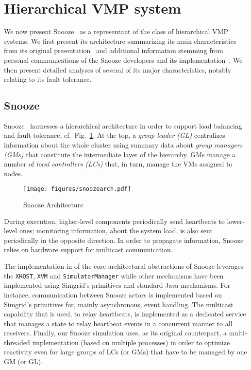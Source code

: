 \section{Hierarchical VMP system}

We now present Snooze~\cite{feller:ccgrid12} as a representant of the
class of hierarchical VMP systems.  We first present its architecture
summarizing its main characteristics from its original
presentation~\cite{feller:ccgrid12} and additional information
stemming from personal communications of the Snooze developers and its
implementation~\cite{snoozeweb,snoozedev14}. We then present detailed
analyses of several of its major characteristics, notably relating to its
fault tolerance.

\subsection{Snooze}
\label{sec:snoozeArchi}

Snooze~\cite{snoozeweb,feller:ccgrid12} harnesses a hierarchical
architecture in order to support load balancing and fault tolerance,
cf.\ Fig.~\ref{fig:snoozearch}.
At the top, %
 a \emph{group leader (GL)} centralizes information about the whole
cluster using summary data about \emph{group managers (GMs)} that
constitute the intermediate layer of the hierarchy. GMs manage a
number of \emph{local controllers (LCs)} that, in turn, manage the VMs
assigned to nodes.

\begin{figure}
  {\centering
\texttt{[image: figures/snoozearch.pdf]}}
  \caption{Snooze Architecture}
  \label{fig:snoozearch}
\end{figure}
During execution, higher-level components periodically send heartbeats
to lower-level ones; monitoring information, \eg about the system
load, is also sent periodically in the opposite direction. In order to
propagate information, Snooze relies on hardware support for multicast
communication.

The implementation in \vmps of the core architectural abstractions of
Snooze %
leverages the \texttt{XHOST}, \texttt{XVM} and
\texttt{SimulatorManager} while other mechanisms have been implemented
using Simgrid's primitives and standard Java mechanisms.
%
For instance, communication between Snooze actors is implemented based
on Simgrid's primitives for, mainly asynchronous, event handling.  The
multicast capability that is used, \eg to relay heartbeats, is
implemented as a dedicated service that manages a state to relay
heartbeat events in a concurrent manner to all receivers.
%
Finally, our Snooze simulation uses, as its original counterpart, a
multi-threaded implementation (\ie based on multiple \sg processes) in
order to optimize reactivity even for large groups of LCs (or GMs)
that have to be managed by one GM (or GL).

